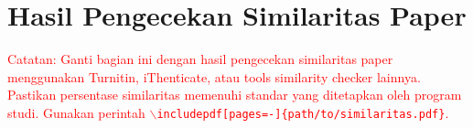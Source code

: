 \section{Hasil Pengecekan Similaritas Paper}

% 

\textcolor{red}{Catatan: Ganti bagian ini dengan hasil pengecekan similaritas paper menggunakan Turnitin, iThenticate, atau tools similarity checker lainnya. Pastikan persentase similaritas memenuhi standar yang ditetapkan oleh program studi. Gunakan perintah \texttt{$\backslash$includepdf[pages=-]\{path/to/similaritas.pdf\}}.}
